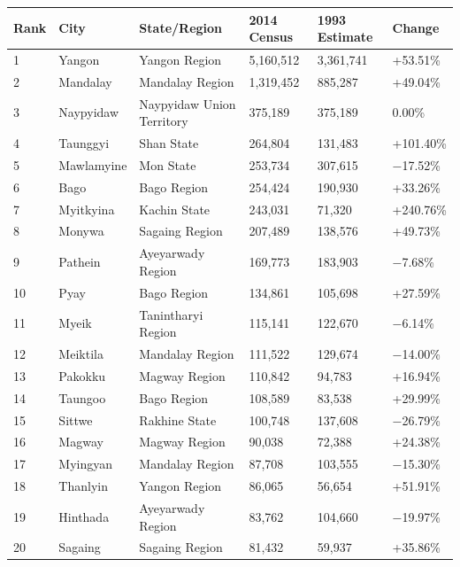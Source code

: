 \documentclass{article}
\begin{document}
\begin{tabular}{llllll}
\toprule
Rank & City & State/Region & 2014 Census & 1993 Estimate & Change \\
\midrule
1 & Yangon & Yangon Region & 5,160,512 & 3,361,741 & +53.51\% \\
2 & Mandalay & Mandalay Region & 1,319,452 & 885,287 & +49.04\% \\
3 & Naypyidaw & Naypyidaw Union Territory & 375,189 & 375,189 & 0.00\% \\
4 & Taunggyi & Shan State & 264,804 & 131,483 & +101.40\% \\
5 & Mawlamyine & Mon State & 253,734 & 307,615 & −17.52\% \\
6 & Bago & Bago Region & 254,424 & 190,930 & +33.26\% \\
7 & Myitkyina & Kachin State & 243,031 & 71,320 & +240.76\% \\
8 & Monywa & Sagaing Region & 207,489 & 138,576 & +49.73\% \\
9 & Pathein & Ayeyarwady Region & 169,773 & 183,903 & −7.68\% \\
10 & Pyay & Bago Region & 134,861 & 105,698 & +27.59\% \\
11 & Myeik & Tanintharyi Region & 115,141 & 122,670 & −6.14\% \\
12 & Meiktila & Mandalay Region & 111,522 & 129,674 & −14.00\% \\
13 & Pakokku & Magway Region & 110,842 & 94,783 & +16.94\% \\
14 & Taungoo & Bago Region & 108,589 & 83,538 & +29.99\% \\
15 & Sittwe & Rakhine State & 100,748 & 137,608 & −26.79\% \\
16 & Magway & Magway Region & 90,038 & 72,388 & +24.38\% \\
17 & Myingyan & Mandalay Region & 87,708 & 103,555 & −15.30\% \\
18 & Thanlyin & Yangon Region & 86,065 & 56,654 & +51.91\% \\
19 & Hinthada & Ayeyarwady Region & 83,762 & 104,660 & −19.97\% \\
20 & Sagaing & Sagaing Region & 81,432 & 59,937 & +35.86\% \\
\bottomrule
\end{tabular}
\end{document}
